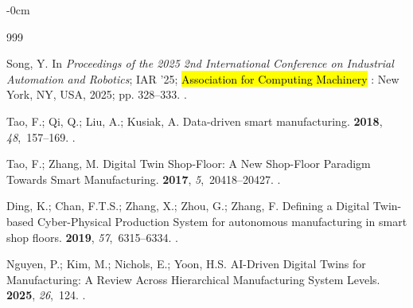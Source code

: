 \documentclass[systems,article,accept,pdftex,moreauthors]{Definitions/mdpi}
\begin{document}
\begin{adjustwidth}{-\extralength}{0cm}




%
\begin{thebibliography}{999}

Song, Y.
\newblock {}
\newblock In \textit{Proceedings of the 2025 2nd International Conference on Industrial
  Automation and Robotics}; IAR '25; \hl{Association for Computing Machinery}%
: New York, NY, USA, 2025; pp. 328--333.
.

Tao, F.; Qi, Q.; Liu, A.; Kusiak, A.
\newblock Data-driven smart manufacturing.
 {\bf 2018}, {\em 48},~157--169.
.

Tao, F.; Zhang, M.
\newblock Digital Twin Shop-Floor: A New Shop-Floor Paradigm Towards Smart
  Manufacturing.
 {\bf 2017}, {\em 5},~20418--20427.
.

Ding, K.; Chan, F.T.S.; Zhang, X.; Zhou, G.; Zhang, F.
\newblock Defining a Digital Twin-based Cyber-Physical Production System for
  autonomous manufacturing in smart shop floors.
 {\bf 2019}, {\em 57},~6315--6334.
.

Nguyen, P.; Kim, M.; Nichols, E.; Yoon, H.S.
\newblock AI-Driven Digital Twins for Manufacturing: A Review Across
  Hierarchical Manufacturing System Levels.
 {\bf 2025}, {\em 26},~124.
.


\end{thebibliography}
\end{adjustwidth}
\end{document}
